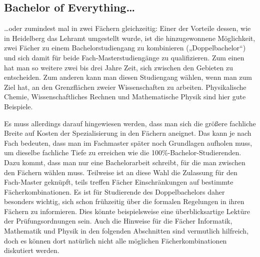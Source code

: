 \subsection{Bachelor of Everything\dots}

\dots oder zumindest mal in zwei Fächern gleichzeitig: Einer der Vorteile dessen, wie in Heidelberg das Lehramt umgestellt wurde, ist die hinzugewonnene Möglichkeit, zwei Fächer zu einem Bachelorstudiengang zu kombinieren („Doppelbachelor“) und sich damit für beide Fach-Mas\-ter\-stu\-di\-en\-gän\-ge zu qualifizieren. Zum einen hat man so weitere zwei bis drei Jahre Zeit, sich zwischen den Gebieten zu entscheiden. Zum anderen kann man diesen Studiengang wählen, wenn man zum Ziel hat, an den Grenzflächen zweier Wissenschaften zu arbeiten. Physikalische Chemie, Wissenschaftliches Rechnen und Mathematische Physik sind hier gute Beispiele.

Es muss allerdings darauf hingewiesen werden, dass man sich die größere fachliche Breite auf Kosten der Spezialisierung in den Fächern aneignet. Das kann je nach Fach bedeuten, dass man im Fachmaster später noch Grundlagen aufholen muss, um dieselbe fachliche Tiefe zu erreichen wie die 100\%-Bachelor-Studierenden. Dazu kommt, dass man nur eine Bachelorarbeit schreibt, für die man zwischen den Fächern wählen muss. Teilweise ist an diese Wahl die Zulassung für den Fach-Master geknüpft, teils treffen Fächer Einschränkungen auf bestimmte Fächerkombinationen. Es ist für Studierende des Doppelbachelors daher besonders wichtig, sich schon frühzeitig über die formalen Regelungen in ihren Fächern zu informieren. Dies könnte beispielsweise eine überblicksartige Lektüre der Prüfungsordnungen sein. Auch die Hinweise für die Fächer Informatik, Mathematik und Physik in den folgenden Abschnitten sind vermutlich hilfreich, doch es können dort natürlich nicht alle möglichen Fächerkombinationen diskutiert werden.


